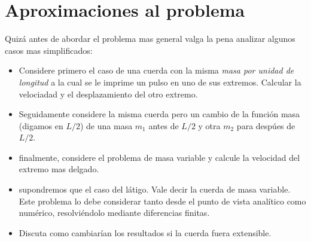 \documentclass[spanish,notitlepage,letterpaper,11pt]{article} %
\begin{document}
\section{Aproximaciones al problema}
Quizá antes de abordar el problema mas general valga la pena analizar algunos casos mas simplificados:
\begin{itemize}
    \item Considere primero el caso de una cuerda con la misma \textit{masa por unidad de longitud} a la cual se le imprime un pulso en uno de sus extremos. Calcular la velociadad y el desplazamiento del otro extremo.
    \item Seguidamente considere la misma cuerda pero un cambio de la función masa (digamos en $L/2$) de una masa $m_{1}$ antes de $L/2$ y otra $m_{2}$ para despúes de $L/2$\cite{RodriguezzuritaEtal2002modos}.
    \item finalmente, considere el problema de masa variable y calcule la velocidad del extremo mas delgado.
    \item supondremos que el caso del látigo. Vale decir la cuerda de masa variable. Este problema lo debe considerar tanto desde el punto de vista analítico como numérico, resolviéndolo mediante diferencias finitas.
    \item Discuta como cambiarían los resultados si la cuerda fuera extensible.
\end{itemize}



\end{document}
